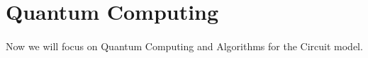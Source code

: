 \section{Quantum Computing}
\label{Sec: Quantum Computing}
\paragraph{}Now we will focus on Quantum Computing and Algorithms for the Circuit model.